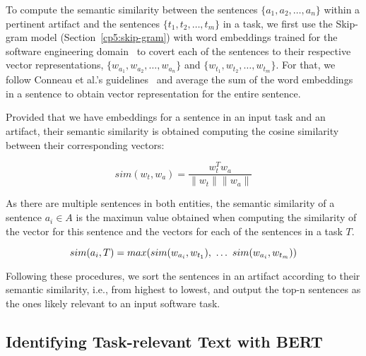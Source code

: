 To compute the semantic similarity between the sentences $\{a_1, a_2, \dots, a_n\}$ within a pertinent artifact and the sentences $\{t_1, t_2, \dots, t_m\}$ in a task,
we first
 use the Skip-gram model (Section~\ref{cp5:skip-gram}) with word embeddings trained for the software engineering domain~\cite{Efstathiou2018} to covert each of the sentences to their respective vector representations, $\{ w_{a_1}, w_{a_2}, \dots, w_{a_n}\}$ and $\{ w_{t_1}, w_{t_2}, \dots, w_{t_m}\}$. For that, we follow Conneau et al.'s guidelines~\cite{conneau2018} 
 and average the sum of the word embeddings in a sentence to obtain vector representation for the entire sentence.






 
 
 
 
 
 
 
 Provided that we have embeddings for a sentence in an input task and an artifact, their semantic similarity is obtained computing the cosine similarity  between their corresponding vectors:



 \begin{equation}
     sim(w_t,w_a) = \frac{w_t^Tw_a}{\|w_t\| \|w_a\|}
     \label{eq:word-sim}
 \end{equation}
 
\smallskip
 As there are multiple sentences in both entities, the semantic similarity of a sentence $a_i \in A$ is the maximun value obtained when computing the similarity of the vector for this sentence and the vectors for each of the sentences in a task $T$.

 \begin{equation}
    sim(a_i, T) = max(sim(w_{a_i}, w_{t_1}), ~\dots~ sim(w_{a_i}, w_{t_m})) \\
\end{equation}


 

Following these procedures, we sort the sentences in an artifact according to their semantic similarity, i.e., from highest to lowest, and output the top-n sentences as the ones likely relevant to an input software task.


\subsection{Identifying Task-relevant Text with BERT}


